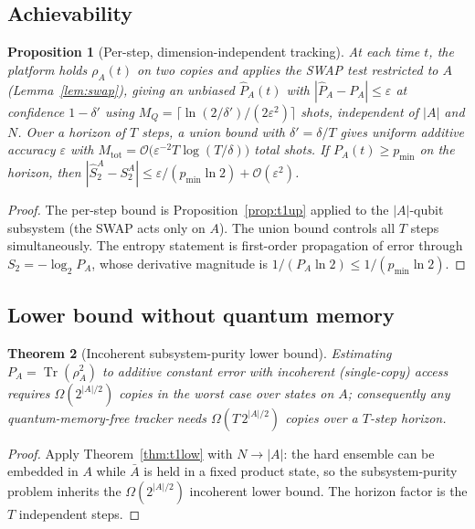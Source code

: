 \documentclass[11pt]{article}
\theoremstyle{plain}
\newtheorem{theorem}{Theorem}[section]
\newtheorem{proposition}[theorem]{Proposition}
\theoremstyle{definition}
\theoremstyle{remark}
\newcommand{\Tr}{\operatorname{Tr}}
\newcommand{\eps}{\varepsilon}
\newcommand{\bigO}{\mathcal{O}}
\begin{document}
\subsection{Achievability}
\begin{proposition}[Per-step, dimension-independent tracking]\label{prop:t3up}
At each time $t$, the platform holds $\rho_A(t)$ on two copies and applies the SWAP test restricted to $A$ (Lemma~\ref{lem:swap}), giving an unbiased $\widehat P_A(t)$ with $|\widehat P_A-P_A|\le\eps$ at confidence $1-\delta'$ using $M_Q=\lceil\ln(2/\delta')/(2\eps^2)\rceil$ shots, \emph{independent of $|A|$ and $N$}. Over a horizon of $T$ steps, a union bound with $\delta'=\delta/T$ gives uniform additive accuracy $\eps$ with $M_{\mathrm{tot}}=\bigO\!\big(\eps^{-2}T\log(T/\delta)\big)$ total shots. If $P_A(t)\ge p_{\min}$ on the horizon, then $|\widehat S_2^A-S_2^A|\le \eps/(p_{\min}\ln 2)+\bigO(\eps^2)$.
\end{proposition}
\begin{proof}
The per-step bound is Proposition~\ref{prop:t1up} applied to the $|A|$-qubit subsystem (the SWAP acts only on $A$). The union bound controls all $T$ steps simultaneously. The entropy statement is first-order propagation of error through $S_2=-\log_2 P_A$, whose derivative magnitude is $1/(P_A\ln2)\le 1/(p_{\min}\ln2)$.\end{proof}

\subsection{Lower bound without quantum memory}
\begin{theorem}[Incoherent subsystem-purity lower bound]\label{thm:t3low}
Estimating $P_A=\Tr(\rho_A^2)$ to additive constant error with incoherent (single-copy) access requires $\Omega(2^{|A|/2})$ copies in the worst case over states on $A$; consequently any quantum-memory-free tracker needs $\Omega(T\,2^{|A|/2})$ copies over a $T$-step horizon.
\end{theorem}
\begin{proof}
Apply Theorem~\ref{thm:t1low} with $N\to|A|$: the hard ensemble can be embedded in $A$ while $\bar A$ is held in a fixed product state, so the subsystem-purity problem inherits the $\Omega(2^{|A|/2})$ incoherent lower bound. The horizon factor is the $T$ independent steps.\end{proof}
\end{document}

